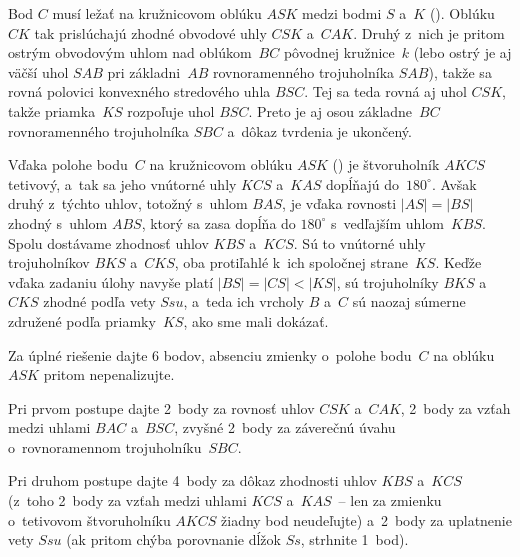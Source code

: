 {%
Bod $C$ musí ležať na kružnicovom oblúku $ASK$ medzi bodmi $S$ a~$K$
(\obr). Oblúku~$CK$ tak prislúchajú zhodné obvodové uhly $CSK$
a~$CAK$. Druhý z~nich je pritom ostrým obvodovým uhlom nad
oblúkom~$BC$ pôvodnej kružnice~$k$ (lebo ostrý je aj väčší uhol
$SAB$ pri základni~$AB$ rovnoramenného trojuholníka $SAB$),
takže sa rovná polovici konvexného stredového uhla $BSC$. Tej
sa teda rovná aj uhol $CSK$, takže priamka~$KS$ rozpoľuje
uhol $BSC$. Preto je aj osou základne~$BC$ rovnoramenného
trojuholníka $SBC$ a~dôkaz tvrdenia je ukončený.
%

\ineres
Vďaka polohe bodu~$C$ na kružnicovom oblúku $ASK$ (\obr) je
štvoruholník $AKCS$ tetivový, a~tak sa jeho vnútorné uhly $KCS$
a~$KAS$ dopĺňajú do~$180^{\circ}$. Avšak druhý z~týchto uhlov,
totožný s~uhlom $BAS$, je
vďaka rovnosti $|AS|=|BS|$ zhodný s~uhlom $ABS$, ktorý sa
zasa dopĺňa do $180^{\circ}$ s~vedľajším uhlom~$KBS$. Spolu
dostávame zhodnosť uhlov $KBS$ a~$KCS$. Sú to vnútorné uhly
trojuholníkov $BKS$ a~$CKS$, oba protiľahlé k~ich spoločnej strane~$KS$. Keďže vďaka zadaniu úlohy navyše platí $|BS|=|CS|<|KS|$,
sú trojuholníky $BKS$ a~$CKS$ zhodné podľa vety $Ssu$, a~teda
ich vrcholy $B$ a~$C$ sú naozaj
súmerne združené podľa priamky~$KS$, ako sme mali dokázať.
%

\nobreak\medskip\petit\noindent
Za úplné riešenie dajte 6 bodov, absenciu zmienky o~polohe bodu~$C$
na oblúku $ASK$ pritom nepenalizujte.

Pri prvom postupe dajte 2~body za rovnosť uhlov $CSK$ a~$CAK$,
2~body za vzťah medzi uhlami $BAC$ a~$BSC$,
zvyšné 2~body za záverečnú úvahu o~rovnoramennom trojuholníku~$SBC$.

Pri druhom postupe dajte 4~body za
dôkaz zhodnosti uhlov $KBS$ a~$KCS$ (z~toho 2~body za vzťah medzi
uhlami $KCS$ a~$KAS$~-- len za zmienku o~tetivovom štvoruholníku $AKCS$
žiadny bod neudeľujte) a~2~body za uplatnenie vety $Ssu$ (ak pritom chýba porovnanie dĺžok $Ss$, strhnite 1~bod).

\endpetit
\bigbreak
}

